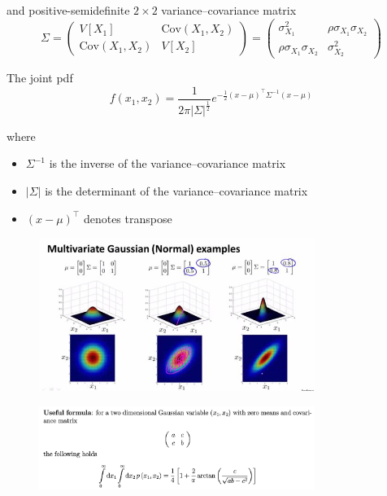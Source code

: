 \documentclass[11pt]{book} %
\begin{document}
and positive-semidefinite $2 \times 2$ variance--covariance matrix
\[
\Sigma = \begin{pmatrix}
V[X_1] & \text{Cov}(X_1, X_2) \\
\text{Cov}(X_1, X_2) & V[X_2]
\end{pmatrix}
= \begin{pmatrix}
\sigma_{X_1}^2 & \rho\sigma_{X_1}\sigma_{X_2} \\
\rho\sigma_{X_1}\sigma_{X_2} & \sigma_{X_2}^2
\end{pmatrix}
\]

The joint pdf
\[
f(x_1, x_2) = \frac{1}{2\pi |\Sigma|^{\frac{1}{2}}} e^{-\frac{1}{2}(x-\mu)^\top \Sigma^{-1} (x-\mu)}
\]

where
\begin{itemize}
    \item $\Sigma^{-1}$ is the inverse of the variance--covariance matrix
    \item $|\Sigma|$ is the determinant of the variance--covariance matrix
    \item $(x-\mu)^\top$ denotes transpose
\end{itemize}

\begin{figure}[h]
    \centering
    \includegraphics[width=0.8\textwidth]{Figs/multivariate_gaussians.jpeg}
    \label{fig:multivariate_gaussian}
\end{figure}



\begin{figure}[h]
    \centering
    \includegraphics[width=0.8\textwidth]{Figs/2_dim_gaussian.png}
    \label{fig:gaussian}
\end{figure}
\end{document}
